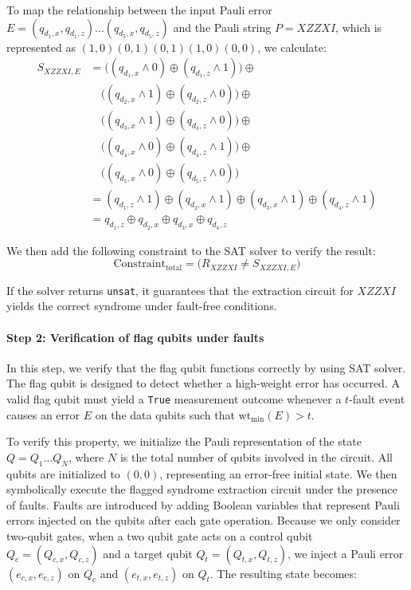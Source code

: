\documentclass[acmsmallw,review]{acmart}
\begin{document}
To map the relationship between the input Pauli error $E = (q_{d_1, x}, q_{d_1,z}) \dots (q_{d_5, x}, q_{d_5,z})$ and the Pauli string $P = XZZXI$, which is represented as $(1,0)(0,1)(0,1)(1,0)(0,0)$, we calculate:
\begin{align*}
S_{XZZXI,E} &= \big( (q_{d_1, x} \land 0) \oplus (q_{d_1, z} \land 1) \big) \oplus \\
          &\quad \big( (q_{d_2, x} \land 1) \oplus (q_{d_2, z} \land 0) \big) \oplus \\
          &\quad \big( (q_{d_3, x} \land 1) \oplus (q_{d_3, z} \land 0) \big) \oplus \\
          &\quad \big( (q_{d_4, x} \land 0) \oplus (q_{d_4, z} \land 1) \big) \oplus \\
          &\quad \big( (q_{d_5, x} \land 0) \oplus (q_{d_5, z} \land 0) \big)  \\
          &= (q_{d_1, z} \land 1) \oplus (q_{d_2, x} \land 1) \oplus (q_{d_3, x} \land 1) \oplus (q_{d_4, z} \land 1) \\
          &= q_{d_1, z} \oplus q_{d_2, x} \oplus q_{d_3, x} \oplus q_{d_4, z}
\end{align*}

We then add the following constraint to the SAT solver to verify the result:
\begin{equation}
\mathrm{Constraint}_{\mathrm{total}} = \big( R_{XZZXI} \neq S_{XZZXI,E} \big)
\end{equation}

If the solver returns \texttt{unsat}, it guarantees that the extraction circuit for $XZZXI$ yields the correct syndrome under fault-free conditions.


\paragraph{\textbf{Step 2: Verification of flag qubits under faults}}
In this step, we verify that the flag qubit functions correctly by using  SAT solver. The flag qubit is designed to detect whether a high-weight error has occurred. A valid flag qubit must yield a \texttt{True} measurement outcome whenever a $t$-fault event causes an error $E$ on the data qubits such that $\mathrm{wt}_{\min}(E) > t$. 

To verify this property, we initialize the Pauli representation of the state $Q = Q_1 \dots Q_N$, where $N$ is the total number of qubits involved in the circuit. All qubits are initialized to $(0,0)$, representing an error-free initial state. We then symbolically execute the flagged syndrome extraction circuit under the presence of faults. Faults are introduced by adding Boolean variables that represent Pauli errors injected on the qubits after each gate operation. Because we only consider two-qubit gates, when a two qubit gate acts on a control qubit $Q_c = (Q_{c,x}, Q_{c,z})$ and a target qubit $Q_t = (Q_{t,x}, Q_{t,z})$, we inject a Pauli error $(e_{c,x}, e_{c,z})$ on $Q_c$ and $(e_{t,x}, e_{t,z})$ on $Q_t$. The resulting state becomes:
\end{document}
